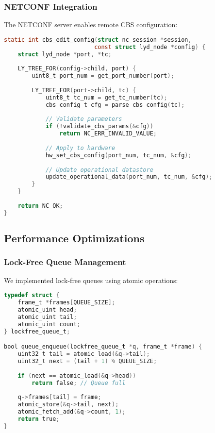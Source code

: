 \documentclass[10pt, journal, compsoc]{IEEEtran}
\begin{document}
\subsubsection{NETCONF Integration}

The NETCONF server enables remote CBS configuration:

\begin{lstlisting}[language=C, caption=NETCONF Operation Handler]
static int cbs_edit_config(struct nc_session *session,
                          const struct lyd_node *config) {
    struct lyd_node *port, *tc;
    
    LY_TREE_FOR(config->child, port) {
        uint8_t port_num = get_port_number(port);
        
        LY_TREE_FOR(port->child, tc) {
            uint8_t tc_num = get_tc_number(tc);
            cbs_config_t cfg = parse_cbs_config(tc);
            
            // Validate parameters
            if (!validate_cbs_params(&cfg))
                return NC_ERR_INVALID_VALUE;
            
            // Apply to hardware
            hw_set_cbs_config(port_num, tc_num, &cfg);
            
            // Update operational datastore
            update_operational_data(port_num, tc_num, &cfg);
        }
    }
    
    return NC_OK;
}
\end{lstlisting}

\subsection{Performance Optimizations}

\subsubsection{Lock-Free Queue Management}

We implemented lock-free queues using atomic operations:

\begin{lstlisting}[language=C, caption=Lock-Free Queue Operations]
typedef struct {
    frame_t *frames[QUEUE_SIZE];
    atomic_uint head;
    atomic_uint tail;
    atomic_uint count;
} lockfree_queue_t;

bool queue_enqueue(lockfree_queue_t *q, frame_t *frame) {
    uint32_t tail = atomic_load(&q->tail);
    uint32_t next = (tail + 1) % QUEUE_SIZE;
    
    if (next == atomic_load(&q->head))
        return false; // Queue full
    
    q->frames[tail] = frame;
    atomic_store(&q->tail, next);
    atomic_fetch_add(&q->count, 1);
    return true;
}
\end{lstlisting}
\end{document}
